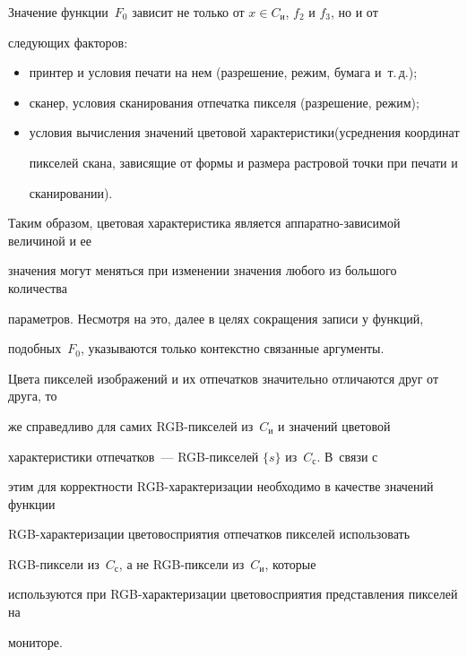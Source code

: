 Значение функции~$F_0$ зависит не только от $x\in C_{\mathrm{и}}$, $f_2$ и $f_3$, но и от


следующих факторов:


\begin{itemize}


\item принтер и условия печати на нем (разрешение, режим, бумага и~т.\,д.);


\item сканер, условия сканирования отпечатка пикселя (разрешение, режим);


\item условия вычисления значений цветовой характеристики\linebreak (усреднения координат


пикселей скана, зависящие от фор\-мы и размера растровой точки при печати и


сканировании).


\end{itemize}





Таким образом, цветовая характеристика является ап\-па\-рат\-но-за\-ви\-си\-мой величиной и ее


значения могут меняться при изменении значения любого из большого количества


параметров. Несмотря на это, далее в целях сокращения записи у функций,


подобных~$F_0$, указываются только контекстно связанные аргументы.





Цвета пикселей изображений и их отпечатков значительно отличаются друг от друга, то


же справедливо для самих RGB-пик\-се\-лей из~$C_{\mathrm{и}}$ и значений цветовой


характеристики отпечатков~--- RGB-пик\-се\-лей $\{s\}$ из~$C_{\mathrm{с}}$. В~связи с


этим для кор\-рект\-ности RGB-характеризации необходимо в качестве значений функции


RGB-характеризации цветовосприятия отпечатков пикселей использовать


RGB-пиксели из~$C_{\mathrm{с}}$, а не RGB-пиксели из~$C_{\mathrm{и}}$, которые


используются при RGB-характеризации цветовосприятия представления пикселей на


мониторе.





